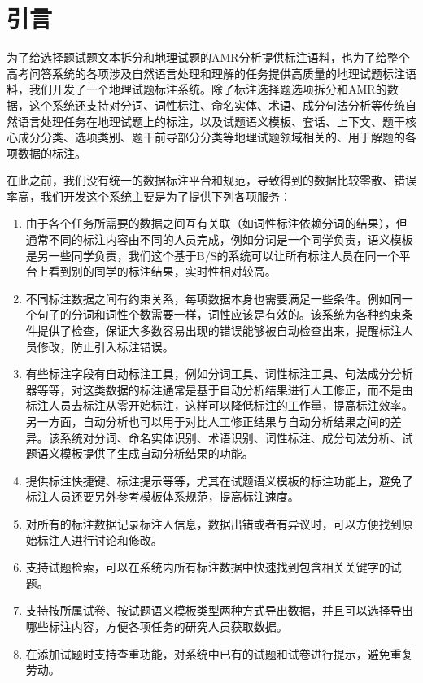 \documentclass[master, winfont]{njuthesis}
\begin{document}
\section{引言}
为了给选择题试题文本拆分和地理试题的AMR分析提供标注语料，也为了给整个高考问答系统的各项涉及自然语言处理和理解的任务提供高质量的地理试题标注语料，我们开发了一个地理试题标注系统。除了标注选择题选项拆分和AMR的数据，这个系统还支持对分词、词性标注、命名实体、术语、成分句法分析等传统自然语言处理任务在地理试题上的标注，以及试题语义模板、套话、上下文、题干核心成分分类、选项类别、题干前导部分分类等地理试题领域相关的、用于解题的各项数据的标注。

在此之前，我们没有统一的数据标注平台和规范，导致得到的数据比较零散、错误率高，我们开发这个系统主要是为了提供下列各项服务：
\begin{enumerate}
	\item 由于各个任务所需要的数据之间互有关联（如词性标注依赖分词的结果），但通常不同的标注内容由不同的人员完成，例如分词是一个同学负责，语义模板是另一些同学负责，我们这个基于B/S的系统可以让所有标注人员在同一个平台上看到别的同学的标注结果，实时性相对较高。
	\item 不同标注数据之间有约束关系，每项数据本身也需要满足一些条件。例如同一个句子的分词和词性个数需要一样，词性应该是有效的。该系统为各种约束条件提供了检查，保证大多数容易出现的错误能够被自动检查出来，提醒标注人员修改，防止引入标注错误。
	\item 有些标注字段有自动标注工具，例如分词工具、词性标注工具、句法成分分析器等等，对这类数据的标注通常是基于自动分析结果进行人工修正，而不是由标注人员去标注从零开始标注，这样可以降低标注的工作量，提高标注效率。另一方面，自动分析也可以用于对比人工修正结果与自动分析结果之间的差异。该系统对分词、命名实体识别、术语识别、词性标注、成分句法分析、试题语义模板提供了生成自动分析结果的功能。
	\item 提供标注快捷键、标注提示等等，尤其在试题语义模板的标注功能上，避免了标注人员还要另外参考模板体系规范，提高标注速度。
	\item 对所有的标注数据记录标注人信息，数据出错或者有异议时，可以方便找到原始标注人进行讨论和修改。
	\item 支持试题检索，可以在系统内所有标注数据中快速找到包含相关关键字的试题。
	\item 支持按所属试卷、按试题语义模板类型两种方式导出数据，并且可以选择导出哪些标注内容，方便各项任务的研究人员获取数据。
	\item 在添加试题时支持查重功能，对系统中已有的试题和试卷进行提示，避免重复劳动。
\end{enumerate}
\end{document}
